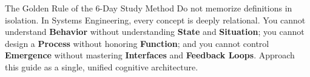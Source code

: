 \begin{takeawaybox}{The Golden Rule of the 6-Day Study Method}
Do not memorize definitions in isolation. In Systems Engineering, every concept is deeply relational. You cannot understand \textbf{Behavior} without understanding \textbf{State} and \textbf{Situation}; you cannot design a \textbf{Process} without honoring \textbf{Function}; and you cannot control \textbf{Emergence} without mastering \textbf{Interfaces} and \textbf{Feedback Loops}. Approach this guide as a single, unified cognitive architecture.
\end{takeawaybox}

